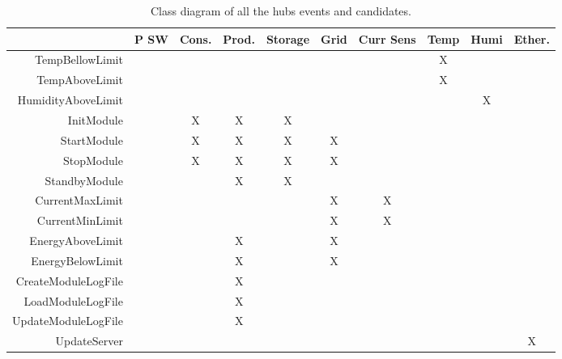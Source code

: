 	\begin{table}[H]
	\begin{tabular}{| r | c |c | c | c | c | c | c | c | c |}
	\hline
		~ & 					P SW & Cons. & Prod. & Storage & Grid & Curr Sens & Temp & Humi & Ether. \\ \hline
		TempBellowLimit 		& ~          & ~         & ~         & ~           & ~           & ~               & X      & ~ 	       & ~	\\ \hline
		TempAboveLimit 		& ~          & ~         & ~         & ~           & ~           & ~               & X      & ~ 	       & ~	\\ \hline
		HumidityAboveLimit	 	& ~          & ~         & ~         & ~           & ~           & ~               & ~      & X 	       & ~	\\ \hline
		InitModule 			& ~          & X         & X         & X           & ~           & ~              & ~      & ~ 	       & ~	\\ \hline
		StartModule 			& ~          & X         & X         & X           & X           & ~              & ~      & ~ 	       & ~	\\ \hline
		StopModule 			& ~          & X         & X         & X           & X           & ~              & ~      & ~ 	       & ~	\\ \hline
		StandbyModule 		& ~          & ~         & X         & X           & ~           & ~               & ~      & ~ 	       & ~	\\ \hline
		CurrentMaxLimit	 	& ~          & ~         & ~         & ~           & X           & X               & ~      & ~ 	       & ~	\\ \hline
		CurrentMinLimit	 	& ~          & ~         & ~         & ~           & X           & X               & ~      & ~ 	       & ~	\\ \hline
		EnergyAboveLimit 		& ~          & ~         & X         & ~           & X           & ~               & ~      & ~ 	       & ~	\\ \hline
		EnergyBelowLimit 		& ~          & ~         & X         & ~           & X           & ~               & ~      & ~ 	       & ~	\\ \hline
		CreateModuleLogFile 	& ~          & ~         & X         & ~           & ~           & ~               & ~      & ~ 	       & ~	\\ \hline
		LoadModuleLogFile 	& ~          & ~         & X         & ~           & ~           & ~               & ~      & ~ 	       & ~	\\ \hline
		UpdateModuleLogFile 	& ~          & ~         & X         & ~           & ~           & ~               & ~      & ~ 	       & ~	\\ \hline
		UpdateServer			& ~          & ~         & ~         & ~           & ~           & ~               & ~      & ~ 	       & X	\\ \hline
	\end{tabular}
	\caption{Class diagram of all the hubs events and candidates.}
\end{table}
